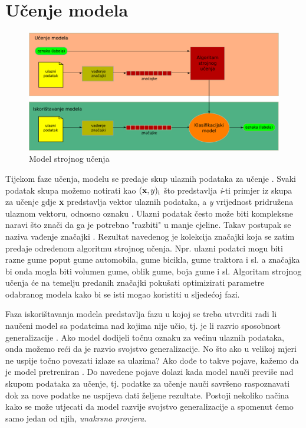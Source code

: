 \documentclass[times, utf8, zavrsni]{fer}
\begin{document}
\section{Učenje modela}

\begin{figure}[H]
    \centering
    \includegraphics[scale=0.5]{img/supervised-learning-flow.png}
    \caption[Caption for LOF]{Model strojnog učenja\footnotemark}
    \label{fig:supervised-learning-flow}
\end{figure}

Tijekom faze učenja, modelu se predaje skup ulaznih podataka za učenje . Svaki podatak skupa možemo notirati kao $(\textbf{x}, y)\textsubscript{i}$ što predstavlja \textit{i}-ti primjer iz skupa za učenje gdje \textbf{x} predstavlja vektor ulaznih podataka, a \textit{y} vrijednost pridružena ulaznom vektoru, odnosno oznaku . Ulazni podatak često može biti kompleksne naravi što znači da ga je potrebno "razbiti" u manje cjeline. Takav postupak se naziva vađenje značajki . Rezultat navedenog je kolekcija značajki koja se zatim predaje određenom algoritmu strojnog učenja. Npr. ulazni podatci mogu biti razne gume poput gume automobila, gume bicikla, gume traktora i sl. a značajka bi onda mogla biti volumen gume, oblik gume, boja gume i sl. Algoritam strojnog učenja će na temelju predanih značajki pokušati optimizirati parametre odabranog modela kako bi se isti mogao koristiti u sljedećoj fazi.

\bigskip

Faza iskorištavanja modela predstavlja fazu u kojoj se treba utvrditi radi li naučeni model sa podatcima nad kojima nije učio, tj. je li razvio sposobnost generalizacije . Ako model dodijeli točnu oznaku za većinu ulaznih podataka, onda možemo reći da je razvio svojstvo generalizacije. No što ako u velikoj mjeri ne uspije točno povezati izlaze sa ulazima? Ako dođe to takve pojave, kažemo da je model pretreniran . Do navedene pojave dolazi kada model nauči previše nad skupom podataka za učenje, tj. podatke za učenje nauči savršeno raspoznavati dok za nove podatke ne uspijeva dati željene rezultate. Postoji nekoliko načina kako se može utjecati da model razvije svojstvo generalizacije a spomenut ćemo samo jedan od njih, \textit{unakrsna provjera}.
\end{document}

